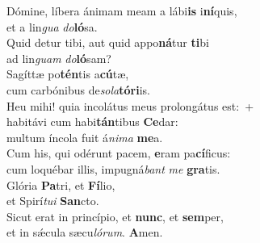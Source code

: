\evenverse Dómine, líbera ánimam meam a lábi\textbf{is} i\textbf{ní}quis,~\*\\
\evenverse et a lin\textit{gua} \textit{do}\textbf{ló}sa.\\
\oddverse Quid detur tibi, aut quid appo\textbf{ná}tur \textbf{ti}bi~\*\\
\oddverse ad lin\textit{guam} \textit{do}\textbf{ló}sam?\\
\evenverse Sagíttæ po\textbf{tén}tis a\textbf{cú}tæ,~\*\\
\evenverse cum carbónibus de\textit{so}\textit{la}\textbf{tó}\textbf{ri}is.\\
\oddverse Heu mihi! quia incolátus meus prolongátus est:~+\\
\oddverse  habitávi cum habi\textbf{tán}tibus \textbf{Ce}dar:~\*\\
\oddverse multum íncola fuit á\textit{ni}\textit{ma} \textbf{me}a.\\
\evenverse Cum his, qui odérunt pacem, \textbf{e}ram pa\textbf{cí}ficus:~\*\\
\evenverse cum loquébar illis, impugná\textit{bant} \textit{me} \textbf{gra}tis.\\
\oddverse Glória \textbf{Pa}tri, et \textbf{Fí}lio,~\*\\
\oddverse et Spirí\textit{tu}\textit{i} \textbf{San}cto.\\
\evenverse Sicut erat in princípio, et \textbf{nunc}, et \textbf{sem}per,~\*\\
\evenverse et in sǽcula sæcu\textit{ló}\textit{rum}. \textbf{A}men.\\
